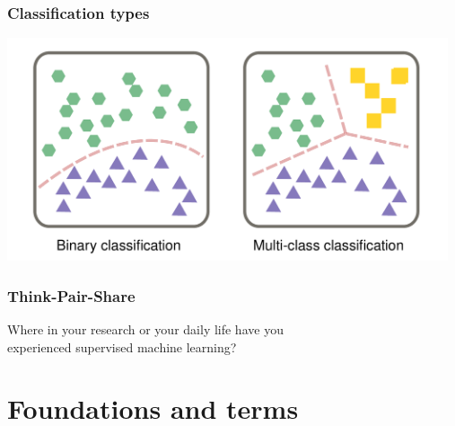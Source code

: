 \documentclass[aspectratio=169]{beamer}
\begin{document}
\begin{frame}
  \frametitle{Classification types}
  \begin{center}
    \includegraphics[width=13cm]{images/binary_vs_multi-class_classification.pdf}
  \end{center}  
\end{frame}

\begin{frame}
  \frametitle{Think-Pair-Share}
  \begin{block}{}
    \begin{center}
      Where in your research or your daily life have you\\
      experienced supervised machine learning?
    \end{center}    
  \end{block}
\end{frame}


\section{Foundations and terms}

\begin{frame}{}
   \tableofcontents[currentsection]
\end{frame}
\end{document}
